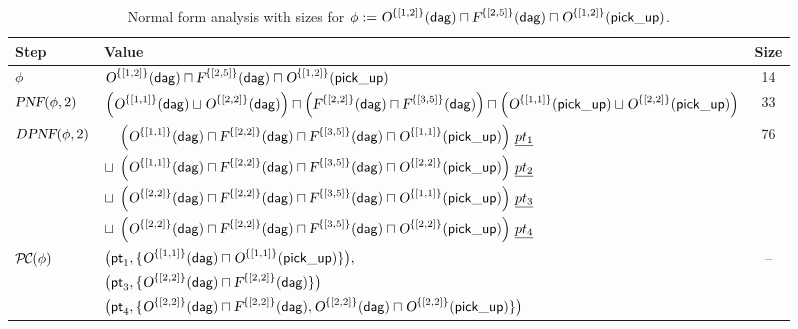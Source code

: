 \begin{example}
\begin{table}[h!]
\centering
\small
\renewcommand{\arraystretch}{1.15}
\begin{tabularx}{\textwidth}{|l|>{\raggedright\arraybackslash}X|c|}
    \hline
    \textbf{Step} & \textbf{Value} & \textbf{Size} \\
    \hline
    $\phi$ 
    & 
    $\textsl{O}^{\{[1,2]\}}(\mathsf{\mathsf{dag}}) \sqcap \textsl{F}^{\{[2,5]\}}(\mathsf{\mathsf{dag}}) \sqcap \textsl{O}^{\{[1,2]\}}(\mathsf{{\mathsf{pick\_up}}})$
    & 14 \\
    \hline
    $\textsl{PNF}(\phi,2)$ 
    & 
    $\left( \textsl{O}^{\{[1,1]\}}(\mathsf{\mathsf{dag}}) \sqcup \textsl{O}^{\{[2,2]\}}(\mathsf{\mathsf{dag}}) \right) 
    \sqcap 
    \left( \textsl{F}^{\{[2,2]\}}(\mathsf{\mathsf{dag}}) \sqcap \textsl{F}^{\{[3,5]\}}(\mathsf{\mathsf{dag}}) \right)
    \sqcap 
    \left( \textsl{O}^{\{[1,1]\}}(\mathsf{{\mathsf{pick\_up}}}) \sqcup \textsl{O}^{\{[2,2]\}}(\mathsf{{\mathsf{pick\_up}}}) \right)$
    & 33 \\
    \hline
    $D\textsl{PNF}(\phi,2)$ 
    & 
    $
    \begin{aligned}
    \left(
        \textsl{O}^{\{[1,1]\}}(\mathsf{\mathsf{dag}})
        \sqcap \textsl{F}^{\{[2,2]\}}(\mathsf{\mathsf{dag}})
        \sqcap \textsl{F}^{\{[3,5]\}}(\mathsf{\mathsf{dag}})
        \sqcap \textsl{O}^{\{[1,1]\}}(\mathsf{{\mathsf{pick\_up}}})
      \right)\,\underline{pt_1}
      \\
      \sqcup\;
      \left(
        \textsl{O}^{\{[1,1]\}}(\mathsf{\mathsf{dag}})
        \sqcap \textsl{F}^{\{[2,2]\}}(\mathsf{\mathsf{dag}})
        \sqcap \textsl{F}^{\{[3,5]\}}(\mathsf{\mathsf{dag}})
        \sqcap \textsl{O}^{\{[2,2]\}}(\mathsf{{\mathsf{pick\_up}}})
      \right)\,\underline{pt_2}
      \\
      \sqcup\;
      \left(
        \textsl{O}^{\{[2,2]\}}(\mathsf{\mathsf{dag}})
        \sqcap \textsl{F}^{\{[2,2]\}}(\mathsf{\mathsf{dag}})
        \sqcap \textsl{F}^{\{[3,5]\}}(\mathsf{\mathsf{dag}})
        \sqcap \textsl{O}^{\{[1,1]\}}(\mathsf{{\mathsf{pick\_up}}})
      \right)\,\underline{pt_3}
      \\
      \sqcup\;
      \left(
        \textsl{O}^{\{[2,2]\}}(\mathsf{\mathsf{dag}})
        \sqcap \textsl{F}^{\{[2,2]\}}(\mathsf{\mathsf{dag}})
        \sqcap \textsl{F}^{\{[3,5]\}}(\mathsf{\mathsf{dag}})
        \sqcap \textsl{O}^{\{[2,2]\}}(\mathsf{{\mathsf{pick\_up}}})
      \right)\,\underline{pt_4}
    \end{aligned}
    $
    & 76 \\
    \hline
    $\mathcall{PC}(\phi)$ 
    & 
    $
    \begin{aligned}
    &\big(\mathsf{pt}_1,\{\textsl{O}^{\{[1,1]\}}(\mathsf{\mathsf{dag}}) \sqcap \textsl{O}^{\{[1,1]\}}(\mathsf{{\mathsf{pick\_up}}})\}\big), \\
    &\big(\mathsf{pt}_3,\{\textsl{O}^{\{[2,2]\}}(\mathsf{\mathsf{dag}}) \sqcap \textsl{F}^{\{[2,2]\}}(\mathsf{\mathsf{dag}}) \}\big)\\
    &\big(\mathsf{pt}_4,\{\textsl{O}^{\{[2,2]\}}(\mathsf{\mathsf{dag}}) \sqcap \textsl{F}^{\{[2,2]\}}(\mathsf{\mathsf{dag}}), \textsl{O}^{\{[2,2]\}}(\mathsf{\mathsf{dag}}) \sqcap  \textsl{O}^{\{[2,2]\}}(\mathsf{{\mathsf{pick\_up}}})\} \big)
    \end{aligned}
    $
    & -- \\
    \hline
    \end{tabularx}
    \caption{Normal form analysis with sizes for $\phi := \textsl{O}^{\{[1,2]\}}(\mathsf{\mathsf{dag}}) \sqcap \textsl{F}^{\{[2,5]\}}(\mathsf{\mathsf{dag}}) \sqcap \textsl{O}^{\{[1,2]\}}(\mathsf{{\mathsf{pick\_up}}})$.}
    \label{table:conflict-analysis}
    \end{table}


\end{example}
